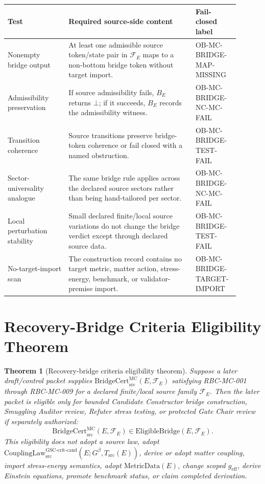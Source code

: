 \documentclass[11pt]{article}
\newtheorem{theorem}{Theorem}
\newcommand{\Gbeta}{G^{\beta}}
\newcommand{\CouplingLaw}{\mathrm{CouplingLaw}_{\mathrm{src}}^{\mathrm{GSC\mbox{-}crit\mbox{-}cand}}}
\newcommand{\MetricData}{\mathrm{MetricData}}
\newcommand{\geff}{g_{\mathrm{eff}}}
\newcommand{\BridgeCert}{\mathrm{BridgeCert}_{\mathrm{src}}^{\mathrm{MC}}}
\newcommand{\EligibleBridge}{\mathrm{EligibleBridge}}
\begin{document}
\begin{longtable}{p{0.24\linewidth}p{0.50\linewidth}p{0.16\linewidth}}
\toprule
Test & Required source-side content & Fail-closed label \\
\midrule
Nonempty bridge output & At least one admissible source token/state pair in
\(\mathcal{F}_E\) maps to a non-bottom bridge token without target import. &
OB-MC-BRIDGE-MAP-MISSING \\
Admissibility preservation & If source admissibility fails, \(B_E\) returns
\(\bot\); if it succeeds, \(B_E\) records the admissibility witness. &
OB-MC-BRIDGE-NC-MC-FAIL \\
Transition coherence & Source transitions preserve bridge-token coherence or
fail closed with a named obstruction. & OB-MC-BRIDGE-TEST-FAIL \\
Sector-universality analogue & The same bridge rule applies across the
declared source sectors rather than being hand-tailored per sector. &
OB-MC-BRIDGE-NC-MC-FAIL \\
Local perturbation stability & Small declared finite/local source variations
do not change the bridge verdict except through declared source data. &
OB-MC-BRIDGE-TEST-FAIL \\
No-target-import scan & The construction record contains no target metric,
matter action, stress-energy, benchmark, or validator-premise import. &
OB-MC-BRIDGE-TARGET-IMPORT \\
\bottomrule
\end{longtable}

\section{Recovery-Bridge Criteria Eligibility Theorem}

\begin{theorem}[Recovery-bridge criteria eligibility theorem]
Suppose a later draft/control packet supplies
\(\BridgeCert(E,\mathcal{F}_E)\) satisfying RBC-MC-001 through RBC-MC-009 for
a declared finite/local source family \(\mathcal{F}_E\). Then the later packet
is eligible only for bounded Candidate Constructor bridge construction,
Smuggling Auditor review, Refuter stress testing, or protected Gate Chair
review if separately authorized:
\[
  \BridgeCert(E,\mathcal{F}_E) \in
  \EligibleBridge(E,\mathcal{F}_E).
\]
This eligibility does not adopt a source law, adopt
\(\CouplingLaw(E;\Gbeta,T_{\mathrm{src}}(E))\), derive or adopt matter
coupling, import stress-energy semantics, adopt \(\MetricData(E)\), change
scoped \(\geff\), derive Einstein equations, promote benchmark status, or
claim completed derivation.
\end{theorem}
\end{document}
